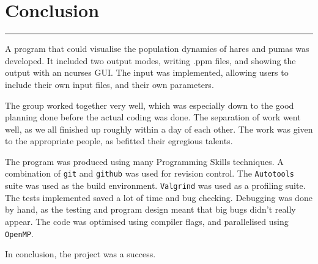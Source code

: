 \section{Conclusion}
\vspace{-2em}\rule{\textwidth}{1pt}\vspace{1em}

A program that could visualise the population dynamics of hares and pumas was developed.
It included two output modes, writing .ppm files, and showing the output with an ncurses GUI.
The input was implemented, allowing users to include their own input files, and their own parameters.

The group worked together very well, which was especially down to the good planning done before the actual coding was done.
The separation of work went well, as we all finished up roughly within a day of each other.
The work was given to the appropriate people, as befitted their egregious talents.

The program was produced using many Programming Skills techniques.
A combination of \texttt{git} and \texttt{github} was used for revision control.
The \texttt{Autotools} suite was used as the build environment.
\texttt{Valgrind} was used as a profiling suite.
The tests implemented saved a lot of time and bug checking.
Debugging was done by hand, as the testing and program design meant that big bugs didn't really appear.
The code was optimised using compiler flags, and parallelised using \texttt{OpenMP}.

In conclusion, the project was a success.
